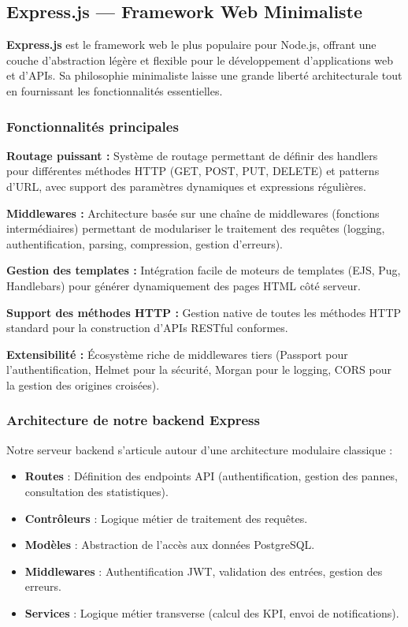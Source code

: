 \subsection{Express.js — Framework Web Minimaliste}

\textbf{Express.js} est le framework web le plus populaire pour Node.js, offrant une couche d'abstraction légère et flexible pour le développement d'applications web et d'APIs. Sa philosophie minimaliste laisse une grande liberté architecturale tout en fournissant les fonctionnalités essentielles.

\subsubsection{Fonctionnalités principales}

\textbf{Routage puissant :} Système de routage permettant de définir des handlers pour différentes méthodes HTTP (GET, POST, PUT, DELETE) et patterns d'URL, avec support des paramètres dynamiques et expressions régulières.

\textbf{Middlewares :} Architecture basée sur une chaîne de middlewares (fonctions intermédiaires) permettant de modulariser le traitement des requêtes (logging, authentification, parsing, compression, gestion d'erreurs).


\textbf{Gestion des templates :} Intégration facile de moteurs de templates (EJS, Pug, Handlebars) pour générer dynamiquement des pages HTML côté serveur.

\textbf{Support des méthodes HTTP :} Gestion native de toutes les méthodes HTTP standard pour la construction d'APIs RESTful conformes.

\textbf{Extensibilité :} Écosystème riche de middlewares tiers (Passport pour l'authentification, Helmet pour la sécurité, Morgan pour le logging, CORS pour la gestion des origines croisées).

\subsubsection{Architecture de notre backend Express}

Notre serveur backend s'articule autour d'une architecture modulaire classique :

\begin{itemize}
    \item \textbf{Routes} : Définition des endpoints API (authentification, gestion des pannes, consultation des statistiques).
    \item \textbf{Contrôleurs} : Logique métier de traitement des requêtes.
    \item \textbf{Modèles} : Abstraction de l'accès aux données PostgreSQL.
    \item \textbf{Middlewares} : Authentification JWT, validation des entrées, gestion des erreurs.
    \item \textbf{Services} : Logique métier transverse (calcul des KPI, envoi de notifications).
\end{itemize}

